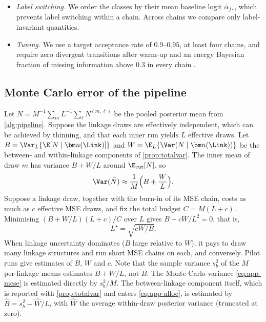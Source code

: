 \begin{itemize}
  \item \emph{Label switching.} We order the classes by their mean baseline logit $\bar\alpha_{j\cdot}$, which prevents label switching within a chain. Across chains we compare only label-invariant quantities.
  \item \emph{Tuning.} We use a target acceptance rate of $0.9$--$0.95$, at least four chains, and require zero divergent transitions after warm-up and an energy Bayesian fraction of missing information above $0.3$ in every chain \citep{betancourt2017}.
\end{itemize}

\subsection{Monte Carlo error of the pipeline}\label{app:comp-mcse}

Let $\bar N=M^{-1}\sum_{m}L^{-1}\sum_\ell N^{(m,\ell)}$ be the pooled posterior mean from \cref{alg:pipeline}. Suppose the linkage draws are effectively independent, which can be achieved by thinning, and that each inner run yields $L$ effective draws. Let $B=\Var_L\{\E[N\mid\bm n(\Link)]\}$ and $W=\E_L\{\Var(N\mid\bm n(\Link))\}$ be the between- and within-linkage components of \cref{prop:totalvar}. The inner mean of draw $m$ has variance $B+W/L$ around $\E_{\mathrm{cut}}[N]$, so
\begin{equation}\label{eq:app-mcse}
  \Var(\bar N)\approx\frac{1}{M}\Big(B+\frac{W}{L}\Big).
\end{equation}
Suppose a linkage draw, together with the burn-in of its MSE chain, costs as much as $c$ effective MSE draws, and fix the total budget $C=M(L+c)$. Minimising $(B+W/L)(L+c)/C$ over $L$ gives $B-cW/L^2=0$, that is,
\begin{equation}\label{eq:app-alloc}
  L^\star=\sqrt{cW/B}.
\end{equation}
When linkage uncertainty dominates ($B$ large relative to $W$), it pays to draw many linkage structures and run short MSE chains on each, and conversely. Pilot runs give estimates of $B$, $W$ and $c$. Note that the sample variance $s_b^2$ of the $M$ per-linkage means estimates $B+W/L$, not $B$. The Monte Carlo variance \eqref{eq:app-mcse} is estimated directly by $s_b^2/M$. The between-linkage component itself, which is reported with \cref{prop:totalvar} and enters \eqref{eq:app-alloc}, is estimated by $\widehat B=s_b^2-\widehat W/L$, with $\widehat W$ the average within-draw posterior variance (truncated at zero).

